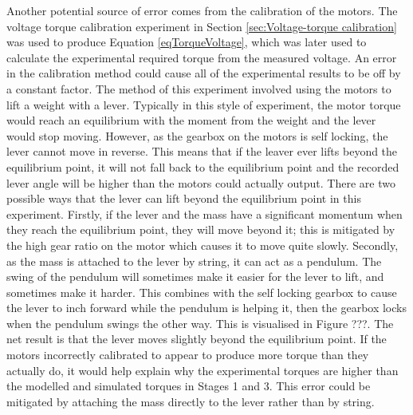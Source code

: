 Another potential source of error comes from the calibration of the motors. The voltage torque calibration experiment in Section \ref{sec:Voltage-torque calibration} was used to produce Equation \ref{eqTorqueVoltage}, which was later used to calculate the experimental required torque from the measured voltage. An error in the calibration method could cause all of the experimental results to be off by a constant factor. The method of this experiment involved using the motors to lift a weight with a lever. Typically in this style of experiment, the motor torque would reach an equilibrium with the moment from the weight and the lever would stop moving. However, as the gearbox on the motors is self locking, the lever cannot move in reverse. This means that if the leaver ever lifts beyond the equilibrium point, it will not fall back to the equilibrium point and the recorded lever angle will be higher than the motors could actually output. There are two possible ways that the lever can lift beyond the equilibrium point in this experiment. Firstly, if the lever and the mass have a significant momentum when they reach the equilibrium point, they will move beyond it; this is mitigated by the high gear ratio on the motor which causes it to move quite slowly. Secondly, as the mass is attached to the lever by string, it can act as a pendulum. The swing of the pendulum will sometimes make it easier for the lever to lift, and sometimes make it harder. This combines with the self locking gearbox to cause the lever to inch forward while the pendulum is helping it, then the gearbox locks when the pendulum swings the other way. This is visualised in Figure ???. The net result is that the lever moves slightly beyond the equilibrium point. If the motors incorrectly calibrated to appear to produce more torque than they actually do, it would help explain why the experimental torques are higher than the modelled and simulated torques in Stages 1 and 3. This error could be mitigated by attaching the mass directly to the lever rather than by string.

